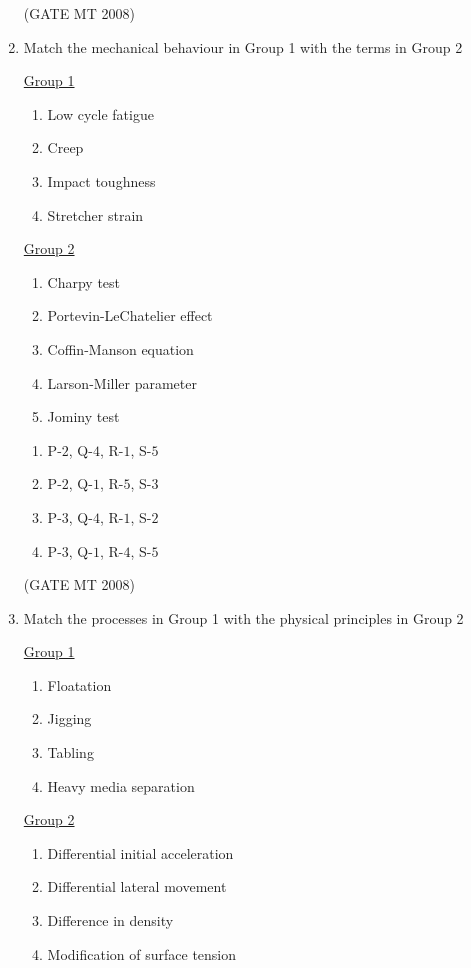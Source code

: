 \documentclass[11pt, letterpaper]{article}
\theoremstyle{remark}
\begin{document}
\begin{enumerate}
\hfill(GATE MT 2008)

\item Match the mechanical behaviour in Group 1 with the terms in Group 2 
\begin{multicols}{2}
\underline{Group 1}
\begin{enumerate}[label=(\Alph*), start=16]
\item Low cycle fatigue
\item Creep
\item Impact toughness
\item Stretcher strain
\end{enumerate}


\underline{Group 2}
\begin{enumerate}[label=(\arabic*), start=1]
\item Charpy test
\item Portevin-LeChatelier effect
\item Coffin-Manson equation
\item Larson-Miller parameter
\item Jominy test
\end{enumerate}
\end{multicols}    

\begin{multicols}{2}
\begin{enumerate}
\item P-$2$, Q-$4$, R-$1$, S-$5$
\item P-$2$, Q-$1$, R-$5$, S-$3$
\item P-$3$, Q-$4$, R-$1$, S-$2$
\item P-$3$, Q-$1$, R-$4$, S-$5$
\end{enumerate}
\end{multicols}

\hfill(GATE MT 2008)

\item Match the processes in Group 1 with the physical principles in Group 2

\begin{multicols}{2}
\underline{Group 1}
\begin{enumerate}
\item Floatation
\item Jigging
\item Tabling
\item Heavy media separation
\end{enumerate}

\underline{Group 2}
\begin{enumerate}[label=(\arabic*), start=1]
\item Differential initial acceleration
\item Differential lateral movement
\item Difference in density
\item Modification of surface tension 
\end{enumerate}
\end{multicols}


\end{enumerate}
\end{document}
